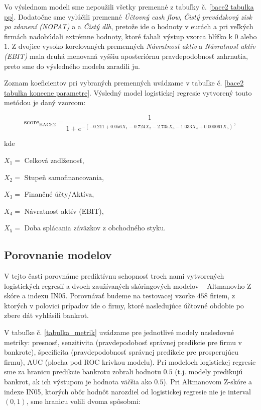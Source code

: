 Vo výslednom modeli sme nepoužili všetky premenné z tabuľky č. \ref{bace2 tabulka pp}.
Dodatočne sme vylúčili premenné \emph{Účtovný cash flow}, \emph{Čistý prevádzkový zisk po zdanení (NOPAT)} a a \emph{Čistý dlh},
pretože ide o hodnoty v eurách a pri veľkých firmách nadobúdali extrémne hodnoty, ktoré ťahali výstup vzorca blížko k \(0\) alebo \(1\).
Z dvojice vysoko korelovaných premenných \emph{Návratnosť aktív} a \emph{Návratnosť aktív (EBIT)} mala druhá menovaná vyššiu aposteriórnu pravdepodobnosť zahrnutia,
preto sme do výsledného modelu zaradili ju.

Zoznam koeficientov pri vybraných premenných uvádzame v tabuľke č. \ref{bace2 tabulka konecne parametre}.
Výsledný model logistickej regresie vytvorený touto metódou je daný vzorcom:

\[
    \text{score}_\text{BACE2} = \frac{1}{1 + e^{-(-0.211 + 0.056X_1 - 0.724X_2 - 2.735X_3 - 1.033X_4 + 0.000061X_5)}},
\]

kde

\(X_1 = \) Celková zadlženosť,

\(X_2 = \) Stupeň samofinancovania,

\(X_3 = \) Finančné účty/Aktíva,

\(X_4 = \) Návratnosť aktív (EBIT),

\(X_5 = \) Doba splácania záväzkov z obchodného styku.


\subsection{Porovnanie modelov}

V tejto časti porovnáme prediktívnu schopnosť troch nami vytvorených logistických regresií a dvoch zaužívaných skóringových modelov – Altmanovho Z-skóre a indexu IN05.
Porovnávať budeme na testovacej vzorke \(458\) firiem, z ktorých v polovici prípadov ide o firmy, ktoré nasledujúce účtovné obdobie po zbere dát vyhlásili bankrot.

V tabuľke č. \ref{tabulka_metrik} uvádzame pre jednotlivé modely nasledovné metriky:
presnosť, senzitivita (pravdepodobosť správnej predikcie pre firmu v bankrote), špecificita (pravdepodobnosť správnej predikcie pre prosperujúcu firmu), AUC (plocha pod ROC krivkou modelu).
Pri modeloch logistickej regresie sme za hranicu predikcie bankrotu zobrali hodnotu \(0.5\) (t.j. modely predikujú bankrot, ak ich výstupom je hodnota väčšia ako \(0.5\)).
Pri Altmanovom Z-skóre a indexe IN05, ktorých obôr hodnôt narozdiel od logistickej regresie nie je interval \((0, 1)\), sme hranicu volili dvoma spôsobmi:

